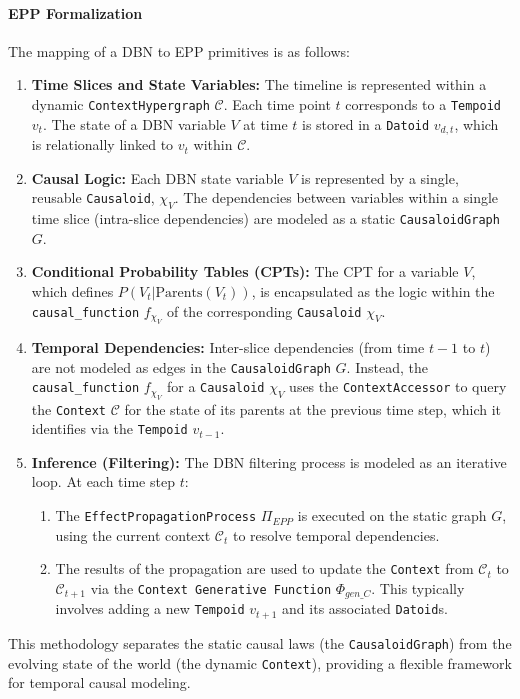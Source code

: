 \paragraph{EPP Formalization}
The mapping of a DBN to EPP primitives is as follows:
\begin{enumerate}
    \item \textbf{Time Slices and State Variables:} The timeline is represented within a dynamic \texttt{ContextHypergraph} \(\mathcal{C}\). Each time point \(t\) corresponds to a \texttt{Tempoid} \(v_t\). The state of a DBN variable \(V\) at time \(t\) is stored in a \texttt{Datoid} \(v_{d,t}\), which is relationally linked to \(v_t\) within \(\mathcal{C}\).

    \item \textbf{Causal Logic:} Each DBN state variable \(V\) is represented by a single, reusable \texttt{Causaloid}, \(\chi_V\). The dependencies between variables within a single time slice (intra-slice dependencies) are modeled as a static \texttt{CausaloidGraph} \(G\).

    \item \textbf{Conditional Probability Tables (CPTs):} The CPT for a variable \(V\), which defines \(P(V_t | \text{Parents}(V_t))\), is encapsulated as the logic within the \texttt{causal\_function} \(f_{\chi_V}\) of the corresponding \texttt{Causaloid} \(\chi_V\).

    \item \textbf{Temporal Dependencies:} Inter-slice dependencies (from time \(t-1\) to \(t\)) are not modeled as edges in the \texttt{CausaloidGraph} \(G\). Instead, the \texttt{causal\_function} \(f_{\chi_V}\) for a \texttt{Causaloid} \(\chi_V\) uses the \texttt{ContextAccessor} to query the \texttt{Context} \(\mathcal{C}\) for the state of its parents at the previous time step, which it identifies via the \texttt{Tempoid} \(v_{t-1}\).

    \item \textbf{Inference (Filtering):} The DBN filtering process is modeled as an iterative loop. At each time step \(t\):
    \begin{enumerate}
        \item The \texttt{EffectPropagationProcess} \(\Pi_{EPP}\) is executed on the static graph \(G\), using the current context \(\mathcal{C}_t\) to resolve temporal dependencies.
        \item The results of the propagation are used to update the \texttt{Context} from \(\mathcal{C}_t\) to \(\mathcal{C}_{t+1}\) via the \texttt{Context Generative Function} \(\Phi_{gen\_C}\). This typically involves adding a new \texttt{Tempoid} \(v_{t+1}\) and its associated \texttt{Datoid}s.
    \end{enumerate}
\end{enumerate}
This methodology separates the static causal laws (the \texttt{CausaloidGraph}) from the evolving state of the world (the dynamic \texttt{Context}), providing a flexible framework for temporal causal modeling.


